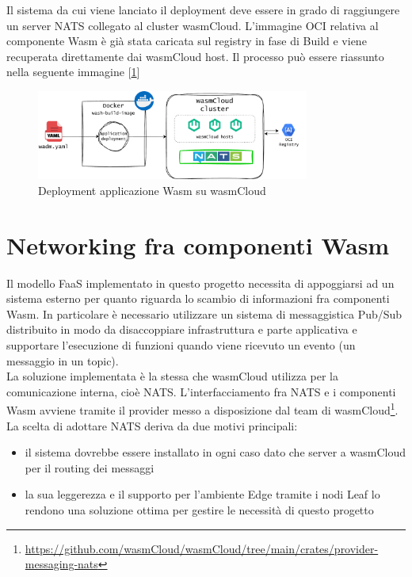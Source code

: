 Il sistema da cui viene lanciato il deployment deve essere in grado di raggiungere un server NATS collegato al cluster wasmCloud. L'immagine OCI relativa al componente Wasm è già stata caricata sul registry in fase di Build e viene recuperata direttamente dai wasmCloud host. Il processo può essere riassunto nella seguente immagine [\ref{fig:code_deploy_pipeline}]

\FloatBarrier
\begin{figure}[h]
    \centering
    \includegraphics[width=0.8\textwidth]{img/schemi/schemi-architettura-deploy.drawio.pdf}
    \caption{Deployment applicazione Wasm su wasmCloud}
    \label{fig:code_deploy_pipeline}
\end{figure}
\FloatBarrier


\section{Networking fra componenti Wasm}

Il modello FaaS implementato in questo progetto necessita di appoggiarsi ad un sistema esterno per quanto riguarda lo scambio di informazioni fra componenti Wasm. In particolare è necessario utilizzare un sistema di messaggistica Pub/Sub distribuito in modo da disaccoppiare infrastruttura e parte applicativa e supportare l'esecuzione di funzioni quando viene ricevuto un evento (un messaggio in un topic).\\
La soluzione implementata è la stessa che wasmCloud utilizza per la comunicazione interna, cioè NATS. L'interfacciamento fra NATS e i componenti Wasm avviene tramite il provider messo a disposizione dal team di wasmCloud\footnote{\url{https://github.com/wasmCloud/wasmCloud/tree/main/crates/provider-messaging-nats}}.\\
La scelta di adottare NATS deriva da due motivi principali:
\begin{itemize}
    \item il sistema dovrebbe essere installato in ogni caso dato che server a wasmCloud per il routing dei messaggi
    \item la sua leggerezza e il supporto per l'ambiente Edge tramite i nodi Leaf lo rendono una soluzione ottima per gestire le necessità di questo progetto
\end{itemize}


